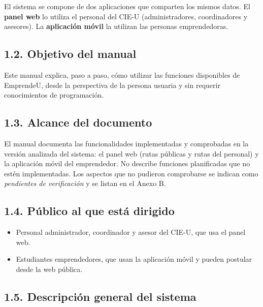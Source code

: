 \documentclass[12pt,letterpaper]{article}
\begin{document}
El sistema se compone de dos aplicaciones que comparten los mismos datos. El \textbf{panel web} lo utiliza el personal del CIE-U (administradores, coordinadores y asesores). La \textbf{aplicación móvil} la utilizan las personas emprendedoras.

\subsection*{1.2. Objetivo del manual}


Este manual explica, paso a paso, cómo utilizar las funciones disponibles de EmprendeU, desde la perspectiva de la persona usuaria y sin requerir conocimientos de programación.

\subsection*{1.3. Alcance del documento}


El manual documenta las funcionalidades implementadas y comprobadas en la versión analizada del sistema: el panel web (rutas públicas y rutas del personal) y la aplicación móvil del emprendedor. No describe funciones planificadas que no estén implementadas. Los aspectos que no pudieron comprobarse se indican como \textit{pendientes de verificación} y se listan en el Anexo B.

\subsection*{1.4. Público al que está dirigido}


\begin{itemize}
\item Personal administrador, coordinador y asesor del CIE-U, que usa el panel web.
\item Estudiantes emprendedores, que usan la aplicación móvil y pueden postular desde la web pública.
\end{itemize}

\subsection*{1.5. Descripción general del sistema}
\end{document}
